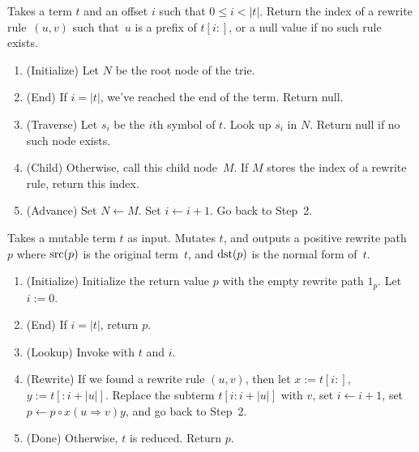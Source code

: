 \documentclass[../generics]{subfiles}
\begin{document}
\begin{algorithm}\label{trie lookup algo}
Takes a term $t$ and an offset $i$ such that $0\leq i<|t|$. Return the index of a rewrite rule~$(u, v)$ such that~$u$ is a prefix of $t[i:]$, or a null value if no such rule exists.
\begin{enumerate}
\item (Initialize) Let $N$ be the root node of the trie.
\item (End) If $i=|t|$, we've reached the end of the term. Return null.
\item (Traverse) Let $s_i$ be the $i$th symbol of $t$. Look up $s_i$ in $N$. Return null if no such node exists.
\item (Child) Otherwise, call this child node~$M$. If $M$ stores the index of a rewrite rule, return this index.
\item (Advance) Set $N \leftarrow M$. Set $i \leftarrow i+1$. Go back to Step~2.
\end{enumerate}
\end{algorithm}

\begin{algorithm}\label{term reduction trie algo}
Takes a mutable term $t$ as input. Mutates $t$, and outputs a positive rewrite path~$p$ where $\operatorname{src}(p)$ is the original term~$t$, and $\operatorname{dst}(p)$ is the normal form of~$t$.
\begin{enumerate}
\item (Initialize) Initialize the return value $p$ with the empty rewrite path $1_p$. Let $i := 0$.
\item (End) If $i=|t|$, return $p$.
\item (Lookup) Invoke  with $t$ and $i$.
\item (Rewrite) If we found a rewrite rule $(u, v)$, then let $x := t[i:]$, $y := t[:i+|u|]$. Replace the subterm $t[i:i+|u|]$ with $v$, set $i\leftarrow i+1$, set $p\leftarrow p\circ x(u\Rightarrow v)y$, and go back to Step~2.
\item (Done) Otherwise, $t$ is reduced. Return $p$.
\end{enumerate}
\end{algorithm}
\end{document}
